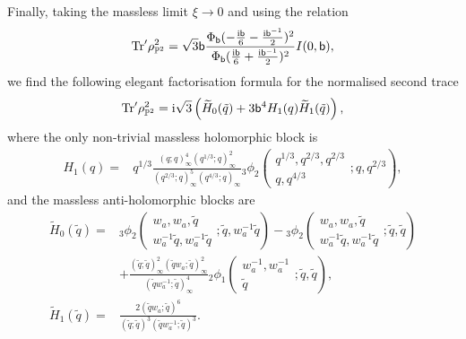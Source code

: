 \documentclass[a4paper,11pt]{article}
\theoremstyle{definition}
\def\IP{{\mathbb P}}
\newcommand{\tr}{{\rm Tr}}
\newcommand{\ri}{{\rm i}}
\def\tq{{\tilde{q}}}
\newcommand{\bb}{\mathsf{b}}
\newcommand{\fad}{\operatorname{\Phi}_{\mathsf{b}}}
\newcommand{\wt}[1]{\widetilde{#1}}
\newcommand{\nn}{\nonumber \\}
\newcommand{\qhg}[6]{{}_#1\phi_{#2}
  \left(\begin{matrix}
    #3  \\
    #4
  \end{matrix} ; #5, #6\right)}
\begin{document}
Finally, taking the massless limit $\xi\rightarrow 0$  and using the relation
%
\begin{equation}
  \tr' \rho_{\IP^2}^2 =
  \sqrt{3}\bb\frac{\fad(-\frac{\ri\bb}{6}-\frac{\ri\bb^{-1}}{2})^2}
  {\fad(\frac{\ri\bb}{6}+\frac{\ri\bb^{-1}}{2})^2} I(0,\bb),
\end{equation}
we find the following elegant factorisation formula for the normalised
second trace
%
\begin{align}
  \tr'\rho_{\IP^2}^2=
  \ri\sqrt{3}\left( \wt{H}_0(\tq)
  +3\bb^4  H_1(q)\wt{H}_1(\tq)\right),
  \label{eq:redfac}
\end{align}
where the only non-trivial massless holomorphic block is
\begin{align}
  H_1(q) =
  &q^{1/3}\frac{(q;q)_\infty^4(q^{1/3};q)_\infty^2}
    {(q^{2/3};q)_\infty^5(q^{4/3};q)_\infty}
    \qhg{3}{2}{q^{1/3},q^{2/3},q^{2/3}}{q,q^{4/3}}{q}{q^{2/3}},
    \label{eq:Hred1}
\end{align}
and the massless anti-holomorphic blocks are
\begin{subequations}
  \begin{align}
    \wt{H}_0(\tq) =
    &\qhg{3}{2}{w_a,w_a,\tq}{w_a^{-1}\tq,w_a^{-1}\tq}{\tq}{w_a^{-1}\tq}
      -\qhg{3}{2}{w_a,w_a,\tq}{w_a^{-1}\tq,w_a^{-1}\tq}{\tq}{\tq}\nn
    &+\frac{(\tq;\tq)_\infty^2(\tq w_a;\tq)_\infty^2}
      {(\tq w_a^{-1};\tq)_\infty^4}
      \qhg{2}{1}{w_a^{-1},w_a^{-1}}{\tq}{\tq}{\tq},
      \label{eq:tHred0}\\
    \wt{H}_1(\tq)%
        =
      &\frac{2(\tq w_a;\tq)^6}{(\tq;\tq)^3(\tq w_a^{-1};\tq)^3}.\qquad
      \label{eq:tHred1}
  \end{align}
\end{subequations}
\end{document}
